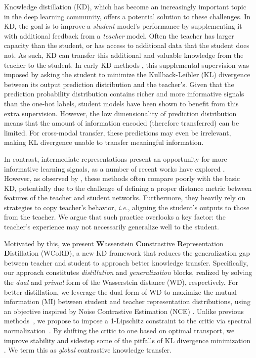\documentclass[final]{cvpr}
\theoremstyle{definition}
\begin{document}
Knowledge distillation (KD), which has become an increasingly important topic in the deep learning community, offers a potential solution to these challenges.
In KD, the goal is to improve a \textit{student} model's performance by supplementing it with additional feedback from a \textit{teacher} model.
Often the teacher has larger capacity than the student, or has access to additional data that the student does not.
As such, KD can transfer this additional and valuable knowledge from the teacher to the student.
In early KD methods \cite{hinton2015distilling}, this supplemental supervision was imposed by asking the student to minimize the Kullback-Leibler (KL) divergence between its output prediction distribution and the teacher's. Given that the prediction probability distribution contains richer and more informative signals than the one-hot labels, student models have been shown to benefit from this extra supervision.
However, the low dimensionality of prediction distribution means that the amount of information encoded (therefore transferred) can be limited. For cross-modal transfer, these predictions may even be irrelevant, making KL divergence unable to transfer meaningful information.


In contrast, intermediate representations present an opportunity for more informative learning signals, as a number of recent works have explored \cite{romero2014fitnets, zagoruyko2016paying,sun2019patient,tian2019contrastive,sun2020contrastive}.
However, as observed by \cite{tian2019contrastive}, these methods often compare poorly with the basic KD, potentially due to the challenge of defining a proper distance metric between features of the teacher and student networks. 
Furthermore, they heavily rely on strategies to copy teacher's behavior, \emph{i.e.}, aligning the student's outputs to those from the teacher. We argue that such practice overlooks a key factor: the teacher's experience may not necessarily generalize well to the student. 

Motivated by this, we present \textbf{W}asserstein \textbf{Co}nstrastive \textbf{R}epresentation \textbf{D}istillation (WCoRD),  a new KD framework that reduces the generalization gap between teacher and student to approach better knowledge transfer. 
Specifically, our approach constitutes \emph{distillation} and \emph{generalization} blocks, realized by solving the \emph{dual} and \emph{primal} form of the Wasserstein distance (WD), respectively.
For better distillation, we leverage the dual form of WD to maximize the mutual information (MI) between student and teacher representation distributions, using an objective inspired by Noise Contrastive Estimation (NCE) \cite{gutmann2010noise}. 
Unlike previous methods~\cite{tian2019contrastive}, we propose to impose a 1-Lipschitz constraint to the critic via spectral normalization~\cite{miyato2018spectral}.
By shifting the critic to one based on optimal transport, we improve stability and sidestep some of the pitfalls of KL divergence minimization \cite{chen2017symmetric, mcallester2020formal}.
We term this as \textit{global} contrastive knowledge transfer.
\end{document}

